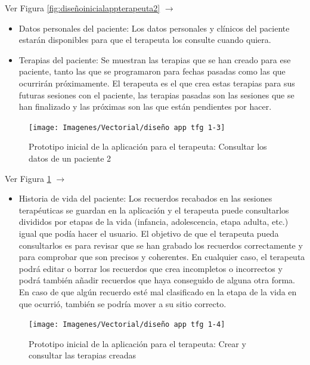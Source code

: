 Ver Figura \ref{fig:diseñoinicialappterapeuta2} $\rightarrow$
\begin{itemize}
	\item Datos personales del paciente: Los datos personales y clínicos del paciente estarán disponibles para que el terapeuta los consulte cuando quiera.
	\item Terapias del paciente: Se muestran las terapias que se han creado para ese paciente, tanto las que se programaron para fechas pasadas como las que ocurrirán próximamente. El terapeuta es el que crea estas terapias para sus futuras sesiones con el paciente, las terapias pasadas son las sesiones que se han finalizado y las próximas son las que están pendientes por hacer.
\end{itemize}

\begin{figure}[h]
	\centering
	\texttt{[image: Imagenes/Vectorial/diseño app tfg 1-3]}
	\caption{Prototipo inicial de la aplicación para el terapeuta: Consultar los datos de un paciente 2}
	\label{fig:diseñoinicialappterapeuta3}
\end{figure}

Ver Figura \ref{fig:diseñoinicialappterapeuta3} $\rightarrow$
\begin{itemize}
	\item Historia de vida del paciente: Los recuerdos recabados en las sesiones terapéuticas se guardan en la aplicación y el terapeuta puede consultarlos divididos por etapas de la vida (infancia, adolescencia, etapa adulta, etc.) igual que podía hacer el usuario. El objetivo de que el terapeuta pueda consultarlos es para revisar que se han grabado los recuerdos correctamente y para comprobar que son precisos y coherentes. En cualquier caso, el terapeuta podrá editar o borrar los recuerdos que crea incompletos o incorrectos y podrá también añadir recuerdos que haya conseguido de alguna otra forma. En caso de que algún recuerdo esté mal clasificado en la etapa de la vida en que ocurrió, también se podría mover a su sitio correcto.
\end{itemize}

\begin{figure}[h]
	\centering
	\texttt{[image: Imagenes/Vectorial/diseño app tfg 1-4]}
	\caption{Prototipo inicial de la aplicación para el terapeuta: Crear y consultar las terapias creadas}
	\label{fig:diseñoinicialappterapeuta4}
\end{figure}

